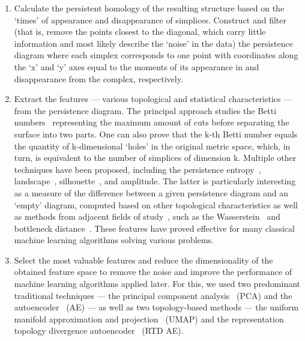 \documentclass[shortAfour,times,sagev]{sagej}
\begin{document}
\begin{enumerate}
    \item 
        Calculate the persistent homology of the resulting structure based on the `times' of appearance and disappearance of simplices. Construct and filter (that is, remove the points closest to the diagonal, which carry little information and most likely describe the `noise' in the data) the persistence diagram where each simplex corresponds to one point with coordinates along the `x' and `y' axes equal to the moments of its appearance in and disappearance from the complex, respectively.

    \item 
Extract the features --- various topological and statistical characteristics --- from the persistence diagram. The principal approach studies the Betti numbers~\cite{Zomorodian2005} representing the maximum amount of cuts before separating the surface into two parts. One can also prove that the k-th Betti number equals the quantity of k-dimensional `holes' in the original metric space, which, in turn, is equivalent to the number of simplices of dimension k. Multiple other techniques have been proposed, including the persistence entropy~\cite{10.1007/978-3-319-29228-1_11}, landscape~\cite{bubenik2015statisticaltopologicaldataanalysis}, silhouette~\cite{chazal2013stochasticconvergencepersistencelandscapes}, and amplitude. The latter is particularly interesting as a measure of the difference between a given persistence diagram and an `empty' diagram, computed based on other topological characteristics as well as methods from adjacent fields of study~\cite{kerber2016geometryhelpscomparepersistence}, such as the Wasserstein~\cite{10.1145/62212.62253} and bottleneck distance~\cite{Efrat2001}. These features have proved effective for many classical machine learning algorithms solving various problems.

    \item 
Select the most valuable features and reduce the dimensionality of the obtained feature space to remove the noise and improve the performance of machine learning algorithms applied later. For this, we used two predominant traditional techniques --- the principal component analysis~\cite{Eckart_Young_1936} (PCA) and the autoencoder~\cite{Autoencoder} (AE) --- as well as two topology-based methods --- the uniform manifold approximation and projection~\cite{mcinnes2020umapuniformmanifoldapproximation} (UMAP) and the representation topology divergence autoencoder~\cite{trofimov2023learningtopologypreservingdatarepresentations} (RTD AE).
\end{enumerate}
\end{document}
